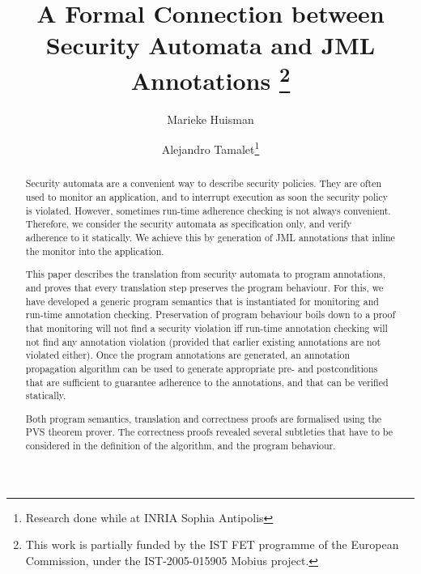 \documentclass[]{llncs}
\title{A Formal Connection between Security Automata and JML Annotations
\thanks{This work is partially funded by the IST FET
programme of the European Commission, under the IST-2005-015905
\textsf{Mobius} project.}}
\author{Marieke Huisman\inst{1} \and Alejandro Tamalet\inst{2}\thanks{Research done while at INRIA Sophia Antipolis}}
\institute{INRIA Sophia Antipolis, France \and
University of Nijmegen, Netherlands}
\begin{document}
\maketitle
\begin{abstract}
Security automata are a convenient way to describe security
policies. They are often used to monitor an application, and to
interrupt execution as soon the security policy is violated. However,
sometimes run-time adherence checking is not always convenient.
Therefore, we consider the security automata as specification only,
and verify adherence to it statically. We achieve this by generation
of JML annotations that inline the monitor into the application.

This paper describes the translation from security automata to program
annotations, and proves that every translation step preserves the
program behaviour. For this, we have developed a generic program
semantics that is instantiated for monitoring and run-time annotation
checking.  Preservation of program behaviour boils down to a proof
that monitoring will not find a security violation iff run-time
annotation checking will not find any annotation violation (provided
that earlier existing annotations are not violated either).  Once the
program annotations are generated, an annotation propagation algorithm
can be used to generate appropriate pre- and postconditions that
are sufficient to guarantee adherence to the annotations, and that can
be verified statically.


Both program semantics, translation and correctness proofs are
formalised using the PVS theorem prover. The correctness proofs
revealed several subtleties that have to be considered in the
definition of the algorithm, and the program behaviour.
\end{abstract}











\end{document}
